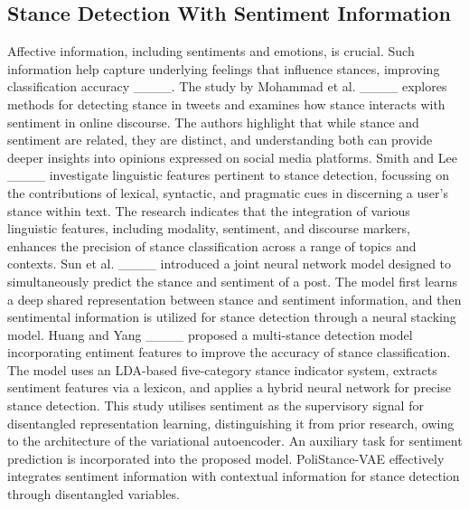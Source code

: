 \subsection{Stance Detection With Sentiment Information}
Affective information, including sentiments and emotions, is crucial. Such information help capture underlying feelings that influence stances, improving classification accuracy ____. The study by Mohammad et al. ____ explores methods for detecting stance in tweets and examines how stance interacts with sentiment in online discourse. The authors highlight that while stance and sentiment are related, they are distinct, and understanding both can provide deeper insights into opinions expressed on social media platforms. Smith and Lee ____ investigate linguistic features pertinent to stance detection, focussing on the contributions of lexical, syntactic, and pragmatic cues in discerning a user's stance within text. The research indicates that the integration of various linguistic features, including modality, sentiment, and discourse markers, enhances the precision of stance classification across a range of topics and contexts. Sun et al. ____ introduced a joint neural network model designed to simultaneously predict the stance and sentiment of a post. The model first learns a deep shared representation between stance and sentiment information, and then sentimental information is utilized for stance detection through a neural stacking model. Huang and Yang ____ proposed a multi-stance detection model incorporating entiment features to improve the accuracy of stance classification. The model uses an LDA-based five-category stance indicator system, extracts sentiment features via a lexicon, and applies a hybrid neural network for precise stance detection. This study utilises sentiment as the supervisory signal for disentangled representation learning, distinguishing it from prior research, owing to the architecture of the variational autoencoder. An auxiliary task for sentiment prediction is incorporated into the proposed model. PoliStance-VAE effectively integrates sentiment information with contextual information for stance detection through disentangled variables.